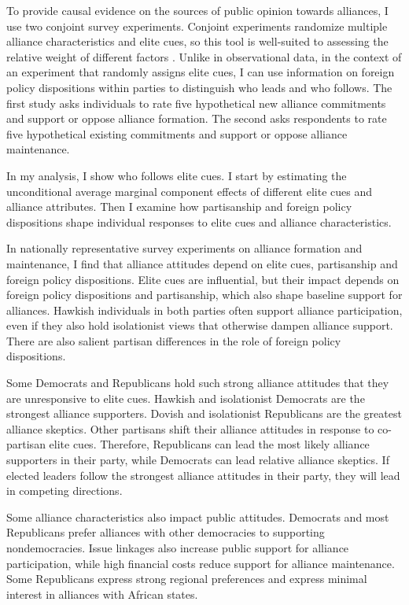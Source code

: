 \documentclass[12pt]{article}
\begin{document}
To provide causal evidence on the sources of public opinion towards alliances, I use two conjoint survey experiments.
Conjoint experiments randomize multiple alliance characteristics and elite cues, so this tool is well-suited to assessing the relative weight of different factors \citep{Hainmuelleretal2014}.
Unlike in observational data, in the context of an experiment that randomly assigns elite cues, I can use information on foreign policy dispositions within parties to distinguish who leads and who follows. 
The first study asks individuals to rate five hypothetical new alliance commitments and support or oppose alliance formation.
The second asks respondents to rate five hypothetical existing commitments and support or oppose alliance maintenance. 


In my analysis, I show who follows elite cues. 
I start by estimating the unconditional average marginal component effects of different elite cues and alliance attributes.
Then I examine how partisanship and foreign policy dispositions shape individual responses to elite cues and alliance characteristics. 


In nationally representative survey experiments on alliance formation and maintenance, I find that alliance attitudes depend on elite cues, partisanship and foreign policy dispositions. 
Elite cues are influential, but their impact depends on foreign policy dispositions and partisanship, which also shape baseline support for alliances. 
Hawkish individuals in both parties often support alliance participation, even if they also hold isolationist views that otherwise dampen alliance support.
There are also salient partisan differences in the role of foreign policy dispositions. 


Some Democrats and Republicans hold such strong alliance attitudes that they are unresponsive to elite cues.
Hawkish and isolationist Democrats are the strongest alliance supporters.
Dovish and isolationist Republicans are the greatest alliance skeptics. 
Other partisans shift their alliance attitudes in response to co-partisan elite cues. 
Therefore, Republicans can lead the most likely alliance supporters in their party, while Democrats can lead relative alliance skeptics. 
If elected leaders follow the strongest alliance attitudes in their party, they will lead in competing directions. 


Some alliance characteristics also impact public attitudes. 
Democrats and most Republicans prefer alliances with other democracies to supporting nondemocracies. 
Issue linkages also increase public support for alliance participation, while high financial costs reduce support for alliance maintenance. 
Some Republicans express strong regional preferences and express minimal interest in alliances with African states. 
\end{document}
